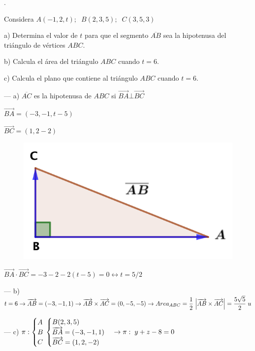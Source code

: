 \begin{ejre}.


Considera	$A(-1,2,t);\;\; B(2,3,5);\;\;C(3,5,3)$
	
	a) Determina el valor de $t$ para que el segmento $\overline{AB}$ sea la hipotenusa del triángulo de vértices $ABC$.
	
	b) Calcula el área del triángulo $ABC$ cuando $t=6$.
	
	c) Calcula el plano que contiene al triángulo $ABC$ cuando $t=6$.
\end{ejre}



\begin{proofw}\renewcommand{\qedsymbol}{$\diamond$}	
	
\begin{multicols}{2}
\noindent --- a) $\overline{AC}$ es la hipotenusa de $ABC$ si
\noindent $\overrightarrow{BA} \bot \overrightarrow{BC}$

\noindent $\overrightarrow{BA}=(-3,-1,t-5)$

\noindent $\overrightarrow{BC}=(1,2-2)$
	\begin{figure}[H]
		\centering
		\includegraphics[width=.5\textwidth]{imagenes/imagenes11/T11IM33.png}
	\end{figure}
\end{multicols}

\noindent $\overrightarrow{BA} \cdot \overrightarrow{BC}=-3-2-2(t-5)=0\leftrightarrow t=5/2$	

\noindent --- b) $t=6 \to \overrightarrow{AB}=(-3,-1,1) \to \overrightarrow{AB} \times \overrightarrow{AC}=(0,-5,-5) \to Area_{ABC}=\dfrac 1 2\; \abs{\overrightarrow{AB} \times \overrightarrow{AC}}=\dfrac {5\sqrt{5}}{2}\; u$

\noindent --- c) $\pi:\begin{cases}A\\B\\C \end{cases} \hspace{-3mm} \begin{cases} B(2,3,5)\\ \overrightarrow{BA}=(-3,-1,1) \\ \overrightarrow{BC}=(1,2,-2) \end{cases}\to \pi:\; y+z-8=0$
\end{proofw}

